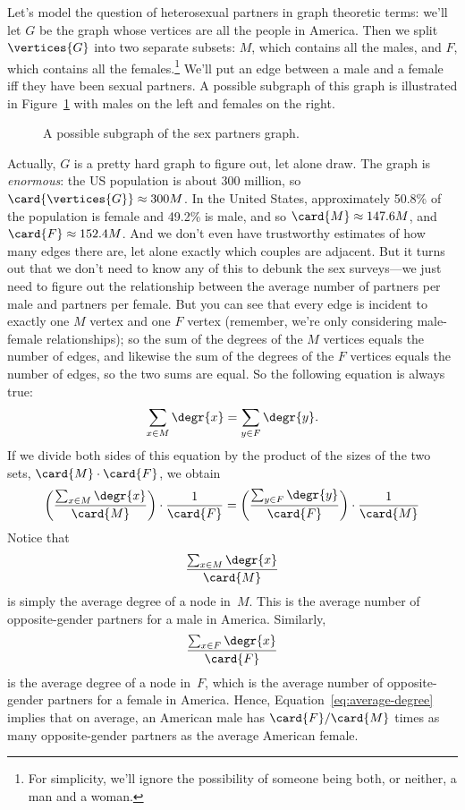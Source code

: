 Let's model the question of heterosexual partners in graph theoretic
terms: we'll let $G$ be the graph whose vertices
are all the people in America.  Then we split $\vertices{G}$ into two separate
subsets: $M$, which contains all the males, and $F$, which contains
all the females.\footnote{For simplicity, we'll ignore the possibility
  of someone being both, or neither, a man and a woman.}  We'll put an
edge between a male and a female iff they have been sexual partners.
A possible subgraph of this graph is illustrated in
Figure~\ref{fig:partners} with males on the left and females on the
right.

\begin{figure}[htbp]


\caption{A possible subgraph of the sex partners graph.}
\label{fig:partners}
\end{figure}

Actually, $G$ is a pretty hard graph to figure out, let alone draw.  The
graph is \emph{enormous}: the US population is about 300 million, so
$\card{\vertices{G}} \approx 300M$.  In the United States, approximately
50.8\% of the population is female and 49.2\% is male, and so $\card{M}
\approx 147.6M$, and $\card{F} \approx 152.4M$.  And we don't even have
trustworthy estimates of how many edges there are, let alone exactly which
couples are adjacent.  But it turns out that we don't need to know any of
this to debunk the sex surveys---we just need to figure out the
relationship between the average number of partners per male and partners
per female.   But you can see that every edge is incident
to exactly one $M$ vertex and one $F$ vertex (remember, we're only
considering male-female relationships); so the sum of the degrees of the
$M$ vertices equals the number of edges, and  likewise
the sum of the degrees of the $F$ vertices equals the number of edges, so
the two sums are equal.  So the following equation is always true:
%
\[
\sum_{x \in M} \degr{x} = \sum_{y \in F} \degr{y}.
\]
%
If we divide both sides of this equation by the product of the sizes
of the two sets, $\card{M} \cdot \card{F}$, we obtain
%
\begin{equation}\label{eq:average-degree}
\left(\frac{\sum_{x \in M} \degr{x}}{\card{M}}\right) \cdot \frac{1}{\card{F}} =
\left(\frac{\sum_{y \in F} \degr{y}}{\card{F}}\right) \cdot \frac{1}{\card{M}}
\end{equation}
Notice that
\begin{equation*}
    \frac{\sum_{x \in M} \degr{x}}{\card{M}}
\end{equation*}
is simply the average degree of a node in~$M$.  This is the average
number of opposite-gender partners for a male in America.  Similarly,
\begin{equation*}
    \frac{\sum_{x \in F} \degr{x}}{\card{F}}
\end{equation*}
is the average degree of a node in~$F$, which is the average number of
opposite-gender partners for a female in America.  Hence,
Equation~\ref{eq:average-degree} implies that on average, an American
male has $\card{F}/\card{M}$ times as many opposite-gender partners as the
average American female.

